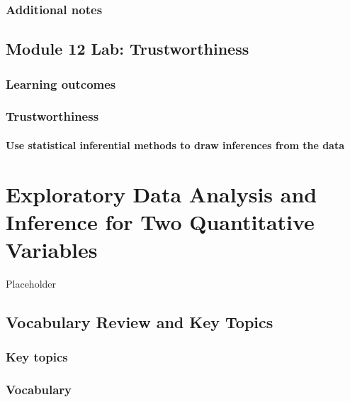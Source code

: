 \documentclass[
]{report}
\begin{document}
\subsection{Additional notes}\label{additional-notes-24}

\section{Module 12 Lab: Trustworthiness}\label{module-12-lab-trustworthiness}

\subsection{Learning outcomes}\label{learning-outcomes-29}

\subsection{Trustworthiness}\label{trustworthiness}

\subsubsection*{Use statistical inferential methods to draw inferences from the data}\label{use-statistical-inferential-methods-to-draw-inferences-from-the-data-7}

\chapter{Exploratory Data Analysis and Inference for Two Quantitative Variables}\label{exploratory-data-analysis-and-inference-for-two-quantitative-variables}

Placeholder

\section{Vocabulary Review and Key Topics}\label{vocabulary-review-and-key-topics-10}

\subsection{Key topics}\label{key-topics-12}

\subsection{Vocabulary}\label{vocabulary-10}
\end{document}

